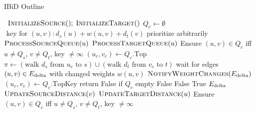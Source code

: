 \begin{algorithm}[t]
   \caption{IBiD Outline}
   \label{alg:ibid}
   \begin{algorithmic}[1]
       {\,}
         \State $\mbox{\sc InitializeSource}(); \; \mbox{\sc InitializeTarget}()$
         \State $Q_c \gets \emptyset$
            \Comment $\mbox{ key for } (u,v): d_s(u) + w(u,v) + d_t(v)$
         \Loop
                     \Comment prioritize arbitrarily
                  \State $\mbox{\sc ProcessSourceQueue}(u)$
               \Else
                  \State $\mbox{\sc ProcessTargetQueue}(u)$
               \EndIf
               \State Ensure $(u,v) \in Q_c$ iff
                  $u \neq Q_s$, $v \neq Q_t$, key $\neq \infty$
            \EndWhile
            \State $(u_c,v_c) \gets Q_c.\mbox{Top}$
            \State $\pi \gets
               ( \mbox{walk } d_s \mbox{ from } u_c \mbox{ to } s )
               \cup
               ( \mbox{walk } d_t \mbox{ from } v_c \mbox{ to } t )$
            \State wait for edges $(u,v) \in E_{\mbox{\scriptsize delta}}$ with changed weights $w(u,v)$
            \State $\mbox{\sc NotifyWeightChanges}(E_{\mbox{\scriptsize delta}})$
         \EndLoop
      \EndProcedure
       {\,}
         \State $(u_c,v_c) \gets Q_c.\mbox{TopKey}$
            \Comment return False if $Q_c$ empty
            \State \Return False
         \EndIf
            \State \Return False
         \EndIf
         \State \Return True
      \EndFunction
       {$E_{\mbox{\scriptsize delta}}$}
            \State $\mbox{\sc UpdateSourceDistance}(v)$
            \State $\mbox{\sc UpdateTargetDistance}(u)$
         \EndFor
         \State Ensure $(u,v) \in Q_c$ iff
            $u \neq Q_s$, $v \neq Q_t$, key $\neq \infty$
      \EndProcedure
   \end{algorithmic}
\end{algorithm}

